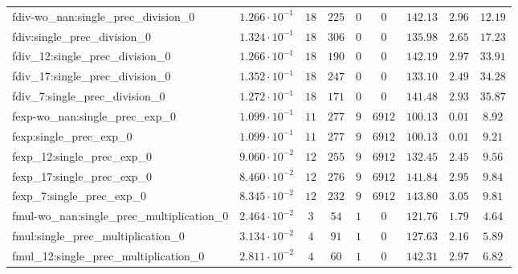 \begin{tabular}{|l|c|c|c|c|c|c|c|c|}
fdiv-wo\_nan:single\_prec\_division\_0         & $ 1.266 \cdot 10^{-1} $ & $ 18     $ & $ 225   $ & $ 0   $ & $ 0      $ & $ 142.13      $ & $ 2.96    $ & $ 12.19   $ \\
fdiv:single\_prec\_division\_0                 & $ 1.324 \cdot 10^{-1} $ & $ 18     $ & $ 306   $ & $ 0   $ & $ 0      $ & $ 135.98      $ & $ 2.65    $ & $ 17.23   $ \\
fdiv\_12:single\_prec\_division\_0             & $ 1.266 \cdot 10^{-1} $ & $ 18     $ & $ 190   $ & $ 0   $ & $ 0      $ & $ 142.19      $ & $ 2.97    $ & $ 33.91   $ \\
fdiv\_17:single\_prec\_division\_0             & $ 1.352 \cdot 10^{-1} $ & $ 18     $ & $ 247   $ & $ 0   $ & $ 0      $ & $ 133.10      $ & $ 2.49    $ & $ 34.28   $ \\
fdiv\_7:single\_prec\_division\_0              & $ 1.272 \cdot 10^{-1} $ & $ 18     $ & $ 171   $ & $ 0   $ & $ 0      $ & $ 141.48      $ & $ 2.93    $ & $ 35.87   $ \\
fexp-wo\_nan:single\_prec\_exp\_0              & $ 1.099 \cdot 10^{-1} $ & $ 11     $ & $ 277   $ & $ 9   $ & $ 6912   $ & $ 100.13      $ & $ 0.01    $ & $ 8.92    $ \\
fexp:single\_prec\_exp\_0                      & $ 1.099 \cdot 10^{-1} $ & $ 11     $ & $ 277   $ & $ 9   $ & $ 6912   $ & $ 100.13      $ & $ 0.01    $ & $ 9.21    $ \\
fexp\_12:single\_prec\_exp\_0                  & $ 9.060 \cdot 10^{-2} $ & $ 12     $ & $ 255   $ & $ 9   $ & $ 6912   $ & $ 132.45      $ & $ 2.45    $ & $ 9.56    $ \\
fexp\_17:single\_prec\_exp\_0                  & $ 8.460 \cdot 10^{-2} $ & $ 12     $ & $ 276   $ & $ 9   $ & $ 6912   $ & $ 141.84      $ & $ 2.95    $ & $ 9.84    $ \\
fexp\_7:single\_prec\_exp\_0                   & $ 8.345 \cdot 10^{-2} $ & $ 12     $ & $ 232   $ & $ 9   $ & $ 6912   $ & $ 143.80      $ & $ 3.05    $ & $ 9.81    $ \\
fmul-wo\_nan:single\_prec\_multiplication\_0   & $ 2.464 \cdot 10^{-2} $ & $ 3      $ & $ 54    $ & $ 1   $ & $ 0      $ & $ 121.76      $ & $ 1.79    $ & $ 4.64    $ \\
fmul:single\_prec\_multiplication\_0           & $ 3.134 \cdot 10^{-2} $ & $ 4      $ & $ 91    $ & $ 1   $ & $ 0      $ & $ 127.63      $ & $ 2.16    $ & $ 5.89    $ \\
fmul\_12:single\_prec\_multiplication\_0       & $ 2.811 \cdot 10^{-2} $ & $ 4      $ & $ 60    $ & $ 1   $ & $ 0      $ & $ 142.31      $ & $ 2.97    $ & $ 6.82    $ \\

\end{tabular}
